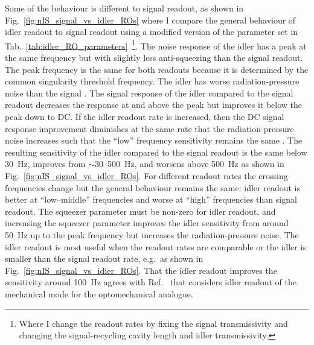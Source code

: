 Some of the behaviour is different to signal readout, as shown in Fig.~\ref{fig:nIS_signal_vs_idler_ROs} where I compare the general behaviour of idler readout to signal readout using a modified version of the parameter set in Tab.~\ref{tab:idler_RO_parameters}~\footnote{Where I change the readout rates by fixing the signal transmissivity and changing the signal-recycling cavity length and idler transmissivity.}. The noise response of the idler has a peak at the same frequency but with slightly less anti-squeezing  than the signal readout. The peak frequency is the same for both readouts because it is determined by the common singularity threshold frequency. The idler has worse radiation-pressure noise than the signal  . The signal response of the idler compared to the signal readout decreases the response at and above the peak but improves it below the peak down to DC. If the idler readout rate is increased, then the DC signal response improvement diminishes at the same rate that the radiation-pressure noise increases such that the ``low'' frequency sensitivity remains the same . 
The resulting sensitivity of the idler compared to the signal readout is the same below 30~Hz, improves from $\sim$30--500~Hz, and worsens above 500~Hz as shown in Fig.~\ref{fig:nIS_signal_vs_idler_ROs}. For different readout rates the crossing frequencies change but the general behaviour remains the same: idler readout is better at ``low--middle'' frequencies and worse at ``high'' frequencies than signal readout. The squeezer parameter must be non-zero for idler readout, and increasing the squeezer parameter improves the idler sensitivity from around 50~Hz up to the peak frequency but increases the radiation-pressure noise. The idler readout is most useful when the readout rates are comparable or the idler is smaller than the signal readout rate, e.g.\ as shown in Fig.~\ref{fig:nIS_signal_vs_idler_ROs}. 
That the idler readout improves the sensitivity around 100~Hz agrees with Ref.~\cite{liEnhancingInterferometerSensitivity2021} that considers idler readout of the mechanical mode for the optomechanical analogue.


